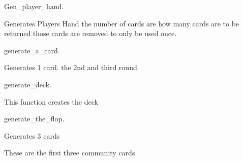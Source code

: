 \documentclass[letterpaper,10pt,english]{sphinxmanual}
\begin{document}
\begin{fulllineitems}
\label{\detokenize{PlayHoldEm:PlayHoldEm.gen_player_hand}}
\sphinxAtStartPar
Gen\_player\_hand.

\sphinxAtStartPar
Generates Players Hand
the number of cards are how many cards are to be returned
those cards are removed to only be used once.

\end{fulllineitems}


\begin{fulllineitems}
\label{\detokenize{PlayHoldEm:PlayHoldEm.generate_a_card}}
\sphinxAtStartPar
generate\_a\_card.

\sphinxAtStartPar
Generates 1 card. the 2nd and third round.

\end{fulllineitems}


\begin{fulllineitems}
\label{\detokenize{PlayHoldEm:PlayHoldEm.generate_deck}}
\sphinxAtStartPar
generate\_deck.

\sphinxAtStartPar
This function creates the deck

\end{fulllineitems}


\begin{fulllineitems}
\label{\detokenize{PlayHoldEm:PlayHoldEm.generate_the_flop}}
\sphinxAtStartPar
generate\_the\_flop.

\sphinxAtStartPar
Generates 3 cards

\sphinxAtStartPar
These are the first three community cards

\end{fulllineitems}
\end{document}
